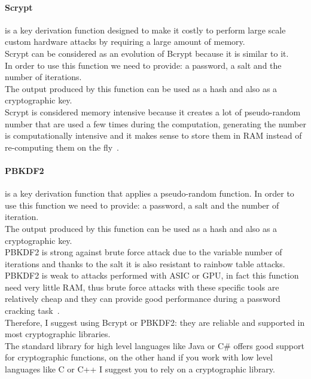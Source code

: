 \paragraph{Scrypt} is a key derivation function designed to make it costly to perform large scale custom hardware attacks by requiring a large amount of memory.\\
Scrypt can be considered as an evolution of Bcrypt because it is similar to it.\\
In order to use this function we need to provide: a password, a salt and the number of iterations.\\
The output produced by this function can be used as a hash and also as a cryptographic key.\\
Scrypt is considered memory intensive because it creates a lot of pseudo-random number that are used a few times during the computation, generating the number is computationally intensive and it makes sense to store them in RAM instead of re-computing them on the fly~\cite{scrypt}.\\


\paragraph{PBKDF2} is a key derivation function that applies a pseudo-random function.
In order to use this function we need to provide: a password, a salt and the number of iteration.\\
The output produced by this function can be used as a hash and also as a cryptographic key.\\
PBKDF2 is strong against brute force attack due to the variable number of iterations and thanks to the salt it is also resistant to rainbow table attacks.\\
PBKDF2 is weak to attacks performed with ASIC or GPU, in fact this function need very little RAM, thus brute force attacks with these specific tools are relatively cheap and they can provide good performance during a password cracking task~\cite{pbkdf2}.\\

Therefore, I suggest using Bcrypt or PBKDF2: they are reliable and supported in most cryptographic libraries.\\
The standard library for high level languages like Java or C\# offers good support for cryptographic functions, on the other hand if you work with low level languages like C or C++ I suggest you to rely on a cryptographic library.\\


